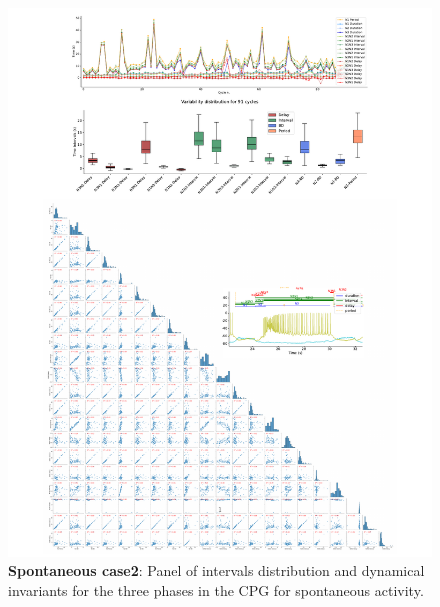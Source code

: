 \begin{figure}[htbp]
	\centering
	\includegraphics[width=1.1\textwidth]{./invariants/data/SUSSEX/prep2/images/3phases/panel_with_pairplot.pdf}
	\caption{\textbf{Spontaneous case2}: Panel of intervals distribution and dynamical invariants for the three phases in the CPG for spontaneous activity.}
	\label{fig:prep2 pairplot invariants}
\end{figure}


